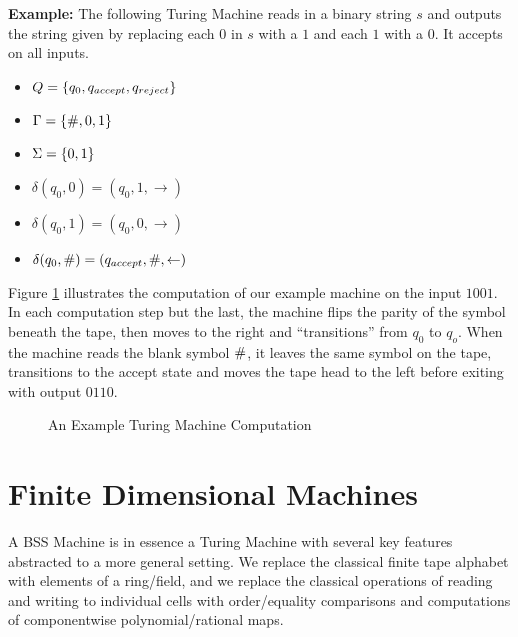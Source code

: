 \textbf{Example: } The following Turing Machine reads in a binary
string $s$ and outputs the string given by replacing each $0$ in $s$
with a $1$ and each $1$ with a $0$.  It accepts on all inputs.

\begin{itemize}
\item $Q = \{q_0, q_{accept}, q_{reject}\}$
\item $\Gamma = \{\#, 0, 1\}$
\item $\Sigma = \{0,1\}$
\item $\delta(q_0, 0) = (q_0, 1, \rightarrow)$
\item $\delta(q_0, 1) = (q_0, 0, \rightarrow)$
\item $\delta(q_0, \#) = (q_{accept}, \#, \leftarrow)$
\end{itemize}

Figure \ref{fig:turing-example} illustrates the computation of our
example machine on the input $1001$. In each computation step but the
last, the machine flips the parity of the symbol beneath the tape,
then moves to the right and ``transitions'' from $q_0$ to $q_o$.  When
the machine reads the blank symbol $\#$, it leaves the same symbol
on the tape, transitions to the accept state and moves the tape head
to the left before exiting with output $0110$.

\begin{figure}[h]
  \begin{center}
     \vspace{1mm}
     \vspace{1mm}
     \vspace{1mm}
     \vspace{1mm}
     \vspace{1mm}
     \vspace{1mm}
  \end{center}
  \caption{An Example Turing Machine Computation}
  \label{fig:turing-example}
\end{figure}

\section{Finite Dimensional Machines}

A BSS Machine is in essence a Turing Machine with several key
features abstracted to a more general setting. We replace the
classical finite tape alphabet with elements of a ring/field, and we
replace the classical operations of reading and writing to individual
cells with order/equality comparisons and computations of
componentwise polynomial/rational maps. 
 
